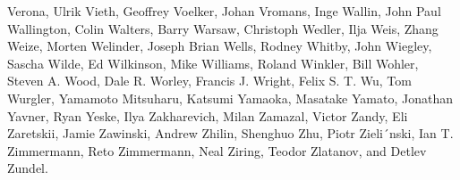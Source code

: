 Verona, Ulrik Vieth, Geoffrey Voelker, Johan Vromans, Inge Wallin, John Paul Wallington, Colin Walters, Barry Warsaw, Christoph Wedler, Ilja Weis, Zhang Weize, Morten Welinder, Joseph Brian Wells, Rodney Whitby, John Wiegley, Sascha Wilde, Ed Wilkinson, Mike Williams, Roland Winkler, Bill Wohler, Steven A. Wood, Dale R. Worley, Francis J. Wright, Felix S. T. Wu, Tom Wurgler, Yamamoto Mitsuharu, Katsumi Yamaoka, Masatake Yamato, Jonathan Yavner, Ryan Yeske, Ilya Zakharevich, Milan Zamazal, Victor Zandy, Eli Zaretskii, Jamie Zawinski, Andrew Zhilin, Shenghuo Zhu, Piotr Zieli´nski, Ian T. Zimmermann, Reto Zimmermann, Neal Ziring, Teodor Zlatanov, and Detlev Zundel.